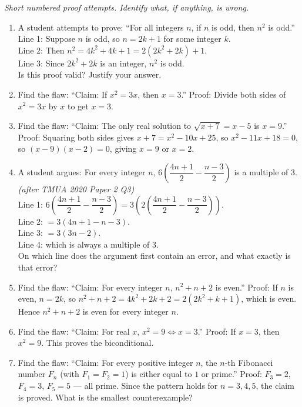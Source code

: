\documentclass[11pt,a4paper]{article}
\begin{document}
\noindent\textit{Short numbered proof attempts. Identify what, if anything, is wrong.}

\begin{enumerate}

\item A student attempts to prove: ``For all integers $n$, if $n$ is odd, then $n^2$ is odd.''\\
Line 1: Suppose $n$ is odd, so $n=2k+1$ for some integer $k$.\\
Line 2: Then $n^2=4k^2+4k+1=2(2k^2+2k)+1$.\\
Line 3: Since $2k^2+2k$ is an integer, $n^2$ is odd.\\
Is this proof valid? Justify your answer.

\item Find the flaw: ``Claim: If $x^2=3x$, then $x=3$.'' Proof: Divide both sides of $x^2=3x$ by $x$ to get $x=3$.

\item Find the flaw: ``Claim: The only real solution to $\sqrt{x+7}=x-5$ is $x=9$.'' Proof: Squaring both sides gives $x+7=x^2-10x+25$, so $x^2-11x+18=0$, so $(x-9)(x-2)=0$, giving $x=9$ or $x=2$.

\item A student argues: For every integer $n$, $6\left(\dfrac{4n+1}{2}-\dfrac{n-3}{2}\right)$ is a multiple of $3$. \textit{\small(after TMUA 2020 Paper 2 Q3)}\\
Line 1: $6\left(\dfrac{4n+1}{2}-\dfrac{n-3}{2}\right)=3\left(2\left(\dfrac{4n+1}{2}-\dfrac{n-3}{2}\right)\right)$.\\
Line 2: $=3(4n+1-n-3)$.\\
Line 3: $=3(3n-2)$.\\
Line 4: which is always a multiple of $3$.\\
On which line does the argument first contain an error, and what exactly is that error?

\item Find the flaw: ``Claim: For every integer $n$, $n^2+n+2$ is even.'' Proof: If $n$ is even, $n=2k$, so $n^2+n+2=4k^2+2k+2=2(2k^2+k+1)$, which is even. Hence $n^2+n+2$ is even for every integer $n$.

\item Find the flaw: ``Claim: For real $x$, $x^2=9 \iff x=3$.'' Proof: If $x=3$, then $x^2=9$. This proves the biconditional.

\item Find the flaw: ``Claim: For every positive integer $n$, the $n$-th Fibonacci number $F_n$ (with $F_1=F_2=1$) is either equal to $1$ or prime.'' Proof: $F_3=2$, $F_4=3$, $F_5=5$ --- all prime. Since the pattern holds for $n=3,4,5$, the claim is proved. What is the smallest counterexample?


\end{enumerate}
\end{document}
